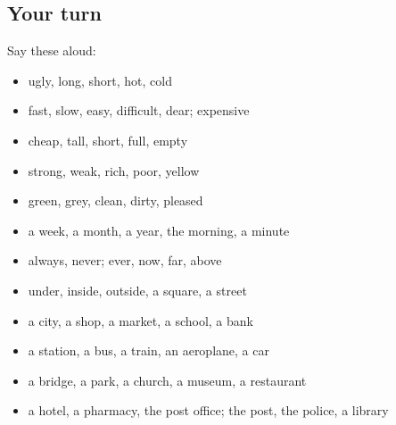 \subsection*{Your turn}
Say these aloud:

\begin{itemize}
\raggedright
  \item ugly, long, short, hot, cold
  \item fast, slow, easy, difficult, dear; expensive
  \item cheap, tall, short, full, empty
  \item strong, weak, rich, poor, yellow
  \item green, grey, clean, dirty, pleased
  \item a week, a month, a year, the morning, a minute
  \item always, never; ever, now, far, above
  \item under, inside, outside, a square, a street
  \item a city, a shop, a market, a school, a bank
  \item a station, a bus, a train, an aeroplane, a car
  \item a bridge, a park, a church, a museum, a restaurant
  \item a hotel, a pharmacy, the post office; the post, the police, a library
\end{itemize}

